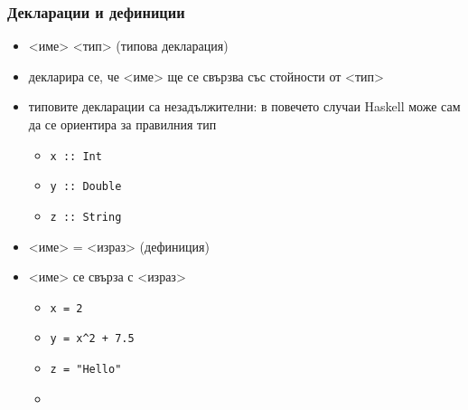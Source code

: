 \documentclass{beamer}
\begin{document}
\begin{frame}
  \frametitle{Декларации и дефиниции}
  \begin{itemize}[<+->]
  \item {}<име> \tta{::} <тип> (типова декларация)
  \item декларира се, че <име> ще се свързва със стойности от <тип>
  \item \alert{типовите декларации са незадължителни: в повечето случаи Haskell може сам да се ориентира за правилния тип}
    \begin{itemize}[<.->]
    \item<+-> \tt{x :: Int}
    \item \tt{y :: Double}
    \item \tt{z :: String}
    \end{itemize}
  \item {}<име> \tta= <израз> (дефиниция)
  \item {}<име> се свърза с <израз>
    \begin{itemize}[<+->]
    \item \tt{x = 2}
    \item \tt{y = x\^{}2 + 7.5}
    \item \tt{z = "Hello"}
    \item {}
    \end{itemize}
  \end{itemize}
\end{frame}
\end{document}
